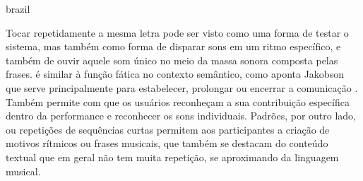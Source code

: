 \begin{otherlanguage*}{brazil}

Tocar repetidamente a mesma letra pode ser visto como uma forma de testar o sistema, mas também como forma de disparar sons em um ritmo específico, e também de ouvir aquele som único no meio da massa sonora composta pelas frases. é similar à função fática no contexto semântico, como aponta Jakobson que serve principalmente para estabelecer, prolongar ou encerrar a comunicação \cite{Jakobson}. Também permite com que os usuários reconheçam a sua contribuição específica dentro da performance e reconhecer os sons individuais. Padrões, por outro lado, ou repetições de sequências curtas permitem aos participantes a criação de motivos rítmicos ou frases musicais, que também se destacam do conteúdo textual que em geral não tem muita repetição, se aproximando da linguagem musical.



\end{otherlanguage*}
